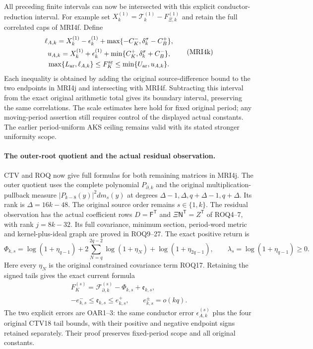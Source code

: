 \documentclass[11pt,a4paper]{article}
\begin{document}
All preceding finite intervals can now be intersected with this
explicit conductor-reduction interval. For example set
$X_k^{(1)}=\mathcal T_k^{(1)}-F_{\Xi,k}^{(1)}$ and retain the full
correlated caps of MRI4f. Define
\[
 \begin{gathered}
 \ell_{A,k}=X_k^{(1)}-\epsilon_k^{(1)}
                    +\max\{-C_K^-,\delta_k^\sigma-C_B^+\},\\
 u_{A,k}=X_k^{(1)}+\epsilon_k^{(1)}
                    +\min\{C_K^+,\delta_k^\sigma+C_B^-\},\\
 \max\{L_{\rm ar},\ell_{A,k}\}\le F_K^{\rm ar}
                \le\min\{U_{\rm ar},u_{A,k}\}.
 \end{gathered}\tag{MRI4k}
\]
Each inequality is obtained by adding the original source-difference
bound to the two endpoints in MRI4j and intersecting with MRI4f.
Subtracting this interval from the exact original arithmetic total
gives its boundary interval, preserving the same correlations.
The scale estimates here hold for fixed original period; any
moving-period assertion still requires control of the displayed
actual constants. The earlier period-uniform AKS ceiling remains
valid with its stated stronger uniformity scope.


\paragraph{The outer-root quotient and the actual residual observation.}
CTV and ROQ now give full formulas for both remaining matrices in
MRI4j. The outer quotient uses the complete polynomial
$P_{\partial,k}$ and the original multiplication-pullback measure
$|P_{k-8}(y)|^2dm_s(y)$ at degrees
$\Delta-1,\Delta,q+\Delta-1,q+\Delta$. Its rank is
$\Delta=16k-48$. The original source order remains $s\in\{1,k\}$.
The residual observation has the actual coefficient rows
$D=\mathsf F^{\mathsf T}$ and $\Xi\mathsf N^{\mathsf T}=Z^{\mathsf T}$
of ROQ4--7, with rank $j=8k-32$. Its full covariance, minimum
section, period-word metric and kernel-plus-ideal graph are proved
in ROQ9--27. The exact positive return is
\[
 \Phi_{k,s}=\log(1+\eta_{q-1})
        +2\sum_{N=q}^{2q-2}\log(1+\eta_N)
        +\log(1+\eta_{2q-1}),\qquad
 \lambda_s=\log(1+\eta_{q-1})\ge0.
 \tag{MRI4l}
\]
Here every $\eta_N$ is the original constrained covariance term
ROQ17. Retaining the signed tails gives the exact current formula
\[
 \begin{gathered}
 F_K^{(s)}=\mathcal F_{\partial,k}^{(s)}-\Phi_{k,s}+\mathfrak e_{k,s},\\
 -e_{k,s}^-\le\mathfrak e_{k,s}\le e_{k,s}^+,\qquad
 e_{k,s}^\pm=o(kq).
 \end{gathered}\tag{MRI4m}
\]
The two explicit errors are OAR1--3: the same conductor error
$\epsilon_{A,k}^{(s)}$ plus the four original CTV18 tail bounds,
with their positive and negative endpoint signs retained separately.
Their proof preserves fixed-period scope and all original constants.
\end{document}
